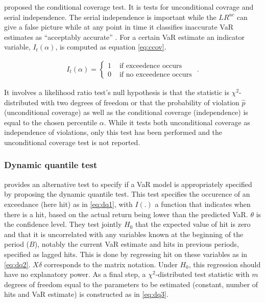 \documentclass[a4paper, twoside]{templates/ociamthesis}
\begin{document}
\noindent \textcite{christoffersen2001} proposed the conditional coverage test. It is tests for unconditional covrage and serial independence. The serial independence is important while the \(L R^{u c}\) can give a false picture while at any point in time it classifies inaccurate VaR estimates as ``acceptably accurate'' \autocite{bali2007}. For a certain VaR estimate an indicator variable, \(I_t(\alpha)\), is computed as equation \eqref{eq:ccov}.

\begin{align}
I_{t}(\alpha)=\left\{\begin{array}{ll}
1 & \text { if exceedence occurs } \\
0 & \text { if no exceedence occurs }
\end{array} .\right.
\label{eq:ccov}
\end{align}

\noindent It involves a likelihood ratio test's null hypothesis is that the statistic is \(\chi^2\)-distributed with two degrees of freedom or that the probability of violation \(\hat p\) (unconditional coverage) as well as the conditional coverage (independence) is equal to the chosen percentile \(\alpha\). While it tests both unconditional coverage as independence of violations, only this test has been performed and the unconditional coverage test is not reported.

\hypertarget{dynamic-quantile-test}{%
\subsubsection{Dynamic quantile test}\label{dynamic-quantile-test}}

\noindent \textcite{engle2004} provides an alternative test to specify if a VaR model is appropriately specified by proposing the dynamic quantile test. This test specifies the occurence of an exceedance (here hit) as in \eqref{eq:dq1}, with \(I(.)\) a function that indicates when there is a hit, based on the actual return being lower than the predicted VaR. \(\theta\) is the confidence level. They test jointly \(H_0\) that the expected value of hit is zero and that it is uncorrelated with any variables known at the beginning of the period (\(B\)), notably the current VaR estimate and hits in previous periods, specified as lagged hits. This is done by regressing hit on these variables as in \eqref{eq:dq2}. \(X\delta\) corresponds to the matrix notation. Under \(H_0\), this regression should have no explanatory power. As a final step, a \(\chi^2\)-distributed test statistic with \(m\) degrees of freedom equal to the parameters to be estimated (constant, number of hits and VaR estimate) is constructed as in \eqref{eq:dq3}.
\end{document}
